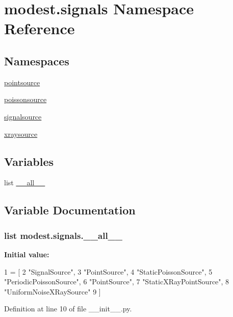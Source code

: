 \hypertarget{namespacemodest_1_1signals}{}\section{modest.\+signals Namespace Reference}
\label{namespacemodest_1_1signals}
\subsection*{Namespaces}
\begin{DoxyCompactItemize}
\item 
 \hyperlink{namespacemodest_1_1signals_1_1pointsource}{pointsource}
\item 
 \hyperlink{namespacemodest_1_1signals_1_1poissonsource}{poissonsource}
\item 
 \hyperlink{namespacemodest_1_1signals_1_1signalsource}{signalsource}
\item 
 \hyperlink{namespacemodest_1_1signals_1_1xraysource}{xraysource}
\end{DoxyCompactItemize}
\subsection*{Variables}
\begin{DoxyCompactItemize}
\item 
list \hyperlink{namespacemodest_1_1signals_aa31151680eba696b8f6eb7877a67adac}{\+\_\+\+\_\+all\+\_\+\+\_\+}
\end{DoxyCompactItemize}


\subsection{Variable Documentation}
\subsubsection[{\texorpdfstring{\+\_\+\+\_\+all\+\_\+\+\_\+}{__all__}}]{\setlength{\rightskip}{0pt plus 5cm}list modest.\+signals.\+\_\+\+\_\+all\+\_\+\+\_\+\hspace{0.3cm}{\ttfamily [private]}}\hypertarget{namespacemodest_1_1signals_aa31151680eba696b8f6eb7877a67adac}{}\label{namespacemodest_1_1signals_aa31151680eba696b8f6eb7877a67adac}
{\bfseries Initial value\+:}
\begin{DoxyCode}
1 = [
2     \textcolor{stringliteral}{"SignalSource"},
3     \textcolor{stringliteral}{"PointSource"},
4     \textcolor{stringliteral}{"StaticPoissonSource"},
5     \textcolor{stringliteral}{"PeriodicPoissonSource"},
6     \textcolor{stringliteral}{"PointSource"},
7     \textcolor{stringliteral}{"StaticXRayPointSource"},
8     \textcolor{stringliteral}{"UniformNoiseXRaySource"}
9 ]
\end{DoxyCode}


Definition at line 10 of file \+\_\+\+\_\+init\+\_\+\+\_\+.\+py.

